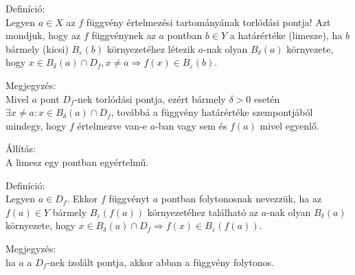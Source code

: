 \documentclass[12pt,a4paper]{scrartcl}
\newenvironment{definicio}{}{}
\newenvironment{allitas}{}{}
\newenvironment{megjegyzes}{}{}
\begin{document}
\begin{definicio}

Definíció:\\
Legyen \(a \in X\) az \(f\) függvény értelmezési tartományának torlódási
pontja! Azt mondjuk, hogy az \(f\) függvénynek az \(a\) pontban
\(b \in Y\) a határértéke (limesze), ha \(b\) bármely (kicsi)
\(B_{\varepsilon}\left( b \right)\) környezetéhez létezik \(a\)-nak
olyan \(B_{\delta}\left( a \right)\) környezete, hogy
\(\left. x \in B_{\delta}\left( a \right) \cap D_{f},x \neq a\Rightarrow f\left( x \right) \in B_{\varepsilon}\left( b \right) \right.\).

\end{definicio}

\begin{megjegyzes}

Megjegyzés:\\
Mivel \(a\) pont \(D_{f}\)-nek torlódási pontja, ezért bármely
\(\delta > 0\) esetén
\(\exists x \neq a:x \in B_{\delta}\left( a \right) \cap D_{f}\),
továbbá a függvény határértéke szempontjából mindegy, hogy \(f\)
értelmezve van-e \(a\)-ban vagy sem és \(f\left( a \right)\) mivel
egyenlő.

\end{megjegyzes}

\begin{allitas}

Állítás:\\
A limesz egy pontban egyértelmű.

\end{allitas}

\begin{definicio}

Definíció:\\
Legyen \(a \in D_{f}\). Ekkor \(f\) függvényt \(a\) pontban folytonosnak
nevezzük, ha az \(f\left( a \right) \in Y\) bármely
\(B_{\varepsilon}\left( {f\left( a \right)} \right)\) környezetéhez
található az \(a\)-nak olyan \(B_{\delta}\left( a \right)\) környezete,
hogy
\(\left. x \in B_{\delta}\left( a \right) \cap D_{f}\Rightarrow f\left( x \right) \in B_{\varepsilon}\left( {f\left( a \right)} \right) \right.\).

\end{definicio}

\begin{megj_extra}

Megjegyzés:\\
ha \(a\) a \(D_{f}\)-nek izolált pontja, akkor abban a függvény
folytonos.

\end{megj_extra}
\end{document}
